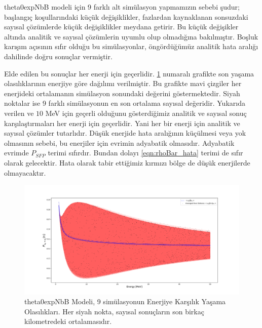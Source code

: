 theta0expNbB modeli için 9 farklı alt simülasyon yapmamızın sebebi şudur; başlangıç koşullarındaki küçük değişiklikler, fazlardan kaynaklanan sonsuzdaki sayısal çözümlerde küçük değişiklikler meydana getirir. Bu küçük değişikler altında analitik ve sayısal çözümlerin uyumlu olup olmadığına bakılmıştır. Boşluk karışım açısının sıfır olduğu bu simülasyonlar, öngördüğümüz analitik hata aralığı dahilinde doğru sonuçlar vermiştir. 

Elde edilen bu sonuçlar her enerji için geçerlidir. \ref{fig:theta0expNbB_energySpec_theta0_averaged} numaralı grafikte son yaşama olasılıklarının enerjiye göre dağılımı verilmiştir. Bu grafikte mavi çizgiler her enerjideki ortalamanın simülasyon sonundaki değerini göstermektedir. Siyah noktalar ise 9 farklı simülasyonun en son ortalama sayısal değeridir. Yukarıda verilen ve $10$ MeV için geçerli olduğunu gösterdiğimiz analitik ve sayısal sonuç karşılaştırmaları her enerji için geçerlidir. Yani her bir enerji için analitik ve sayısal çözümler tutarlıdır. Düşük enerjide hata aralığının küçülmesi veya yok olmasının sebebi, bu enerjiler için evrimin adyabatik olmasıdır. Adyabatik evrimde $ P_{SFP} $ terimi sıfırdır. Bundan dolayı \eqref{eqn:rhoBar_hata} terimi de sıfır olarak gelecektir. Hata olarak tabir ettiğimiz kırmızı bölge de düşük enerjilerde olmayacaktır.

\begin{figure}[hbt!]
    \centering
    \includegraphics[width=\textwidth]{figures/theta0expNbB_energySpec_theta0_averaged.pdf}
    \caption[theta0expNbB Modeli, 9 simülasyonun Enerjiye Karşılık Yaşama Olasılıkları]{theta0expNbB Modeli, 9 simülasyonun Enerjiye Karşılık Yaşama Olasılıkları. Her siyah nokta, sayısal sonuçların son birkaç kilometredeki ortalamasıdır.}
    \label{fig:theta0expNbB_energySpec_theta0_averaged}
\end{figure}


